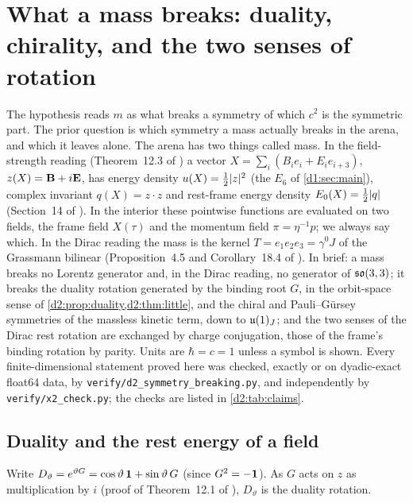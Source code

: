 \section{What a mass breaks: duality, chirality, and the two senses of rotation}
\label{d2:sec:breaks}

The hypothesis reads $m$ as what breaks a symmetry of which $c^2$ is the symmetric part. The prior question is which symmetry a mass
actually breaks in the arena, and which it leaves alone. The arena has two things called mass. In the field-strength reading (Theorem~12.3 of
\cite{ES17}) a vector $X=\sum_i(B_ie_i+E_ie_{i+3})$, $z(X)=\mathbf B+i\mathbf E$, has energy density $u(X)=\tfrac12|z|^2$ (the $E_6$ of \cref{d1:sec:main}),
complex invariant $q(X)=z\cdot z$ and rest-frame energy density $E_0(X)=\tfrac12|q|$ (Section~14 of \cite{ES17}). In the interior these pointwise
functions are evaluated on two fields, the frame field $X(\tau)$ and the momentum field $\pi=\eta^{-1}p$; we always say which. In the Dirac reading the mass is the kernel $T=e_1e_2e_3=\gamma^0J$ of the Grassmann bilinear (Proposition~4.5 and Corollary~18.4 of
\cite{ES17}). In brief: a mass breaks no Lorentz generator and, in the Dirac reading, no generator of $\mathfrak{so}(3,3)$; it breaks the duality rotation
generated by the binding root $G$, in the orbit-space sense of \cref{d2:prop:duality,d2:thm:little}, and the chiral and Pauli--G\"ursey symmetries
of the massless kinetic term, down to $\mathfrak{u}(1)_J$; and the two senses of the Dirac rest rotation are exchanged by charge conjugation, those of the
frame's binding rotation by parity. Units are $\hbar=c=1$ unless a symbol is shown. Every finite-dimensional statement proved here was checked,
exactly or on dyadic-exact float64 data, by \texttt{verify/d2\_symmetry\_breaking.py}, and independently by \texttt{verify/x2\_check.py}; the
checks are listed in \cref{d2:tab:claims}.

\subsection{Duality and the rest energy of a field}
\label{d2:sec:duality}

Write $D_\vartheta=e^{\vartheta G}=\cos\vartheta\,\mathbf 1+\sin\vartheta\,G$ (since $G^2=-\mathbf 1$). As $G$ acts on $z$ as multiplication by $i$
(proof of Theorem~12.1 of \cite{ES17}), $D_\vartheta$ is the duality rotation.

